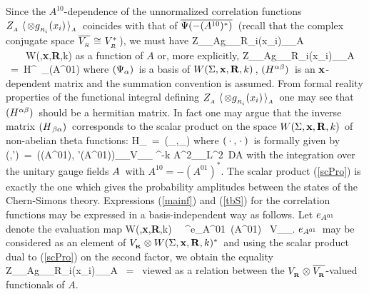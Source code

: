 \vskip 0.6cm


Since the \s$A^{10}$-dependence of the unnormalized
correlation functions
\s$Z_{_A}\s\s\langle\s\otimes g_{_{R_i}}(x_i)\s\rangle_{_A}
\s$ coincides with that
of \s$\overline{\Psi(-(A^{10})^*)}\hspace{0.05cm}$ (recall that the
complex conjugate space \s$\overline{V_{_R}}
\hspace{0.025cm}\cong\hspace{0.025cm} V^*_{_R}\hspace{0.05cm}$)\m, \s we must have
\qq
Z_{_A}\s\s\langle\s\otimes g_{_{R_i}}(x_i)\s\rangle_{_A}
\ \ \in\ \
W(\Sigma,{\bf x},{\bf R},k)
\otimes{}
\non
\qqq
as a function of $A$ or, more explicitly,
\qq
Z_{_A}\s\s\langle\s\otimes g_{_{R_i}}(x_i)\s\rangle_{_A}
\ =\ H^{\alpha\beta}\ \Psi_\alpha(A^{01})
\otimes{}
\label{mainf}
\qqq
where \s$(\Psi_\alpha)\hspace{0.05cm}$ is a basis of
\s$W(\Sigma,{\bf x},{\bf R},k)\hspace{0.05cm}$, \s$(H^{\alpha\beta})\hspace{0.05cm}$
is an \s${\bf x}$-dependent matrix and the summation convention
is assumed. From formal reality properties of the functional
integral defining \s$Z_{_A}\s\s
\langle\s\otimes g_{_{R_i}}(x_i)\s\rangle_{_A}\s$ one
may see that \s$(H^{\alpha\beta})\hspace{0.05cm}$ should be a hermitian
matrix. In fact one may argue that the inverse matrix
\s$(H_{\hspace{0.05cm}\beta\alpha})\hspace{0.05cm}$ corresponds to the
scalar product on the space \s$W(\Sigma,{\bf x},{\bf R},k)\hspace{0.025cm}$
of non-abelian theta functions:
\qq
H_{\beta\alpha}\ =\ (\Psi_\beta,\m\Psi_\alpha)
\label{tbS}
\qqq
where \s$(\m\s\cdot\s\m,\s\cdot\s\m)\s$ is formally given by
\qq
(\Psi,\m\Psi')\ =\
\int(\m\Psi(A^{01}),\s
\Psi'(A^{01})\m)_{_{V_{_{\NR}}}}
\s\s\ee^{-{k\pi}
\s\Vert A\Vert^2_{_{L^2}}}\ DA
\label{scPro}
\qqq
with the integration over the unitary gauge fields
\s$A\hspace{0.05cm}$ with \s$A^{10}=-(A^{01})^*$. \s The scalar
product (\ref{scPro}) is exactly the one which gives
the probability amplitudes between the states of
the Chern-Simons theory. Expressions (\ref{mainf}) and (\ref{tbS})
for the correlation functions may be expressed in a basis-independent
way as follows. Let \s$e_{{A^{01}}}\hspace{0.05cm}$ denote the evaluation
map
\qq
W(\Sigma,{\bf x},{\bf R},k)\s\s\ni\ \Psi\ \s
\mathop{\longrightarrow}\limits^{e_{{A^{01}}}}\ \s\Psi(A^{01})
\ \in\s\s V_{_{\NR}}\s.
\non
\qqq
$e_{{A^{01}}}\hspace{0.05cm}$ may be considered as an element of
\s$V_{_{{{\bf R}}}}\otimes W(\Sigma,{\bf x},{\bf R},k)^*\hspace{0.05cm}$
and using the scalar product dual to (\ref{scPro})
on the second factor, we obtain the equality
\qq
Z_{_A}\s\s\langle\s\otimes g_{_{R_i}}(x_i)\s\rangle_{_A}
\ =\ \overline{(e_{{A^{01}}},
\m\s e_{{-(A^{10})^*}})}
\label{mafA}
\qqq
viewed as a relation between the \s$V_{_{{{\bf R}}}}\otimes\overline{
V_{_{{{\bf R}}}}}$-valued
functionals of $A$.
\vskip 0.4cm

